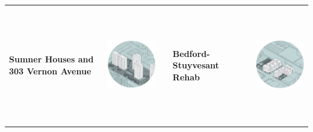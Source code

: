 \begin{minipage}[b][.49\textheight][b]{\textwidth}
\begin{table}[H]

\end{table}

\begin{centering}
\begin{table}[H]
\begin{tabular}{m{1.25in} m{2in} m{.1in} m{1.25in} m{2in}}
\sf\bf{Sumner Houses and 303 Vernon Avenue} & \includegraphics[height=2in]{towers_in_park} & & \sf\bf{Bedford-Stuyvesant Rehab} & \includegraphics[height=2in]{prewar.png}
\end{tabular}
\end{table}
\end{centering}
\end{minipage}
\pagebreak

